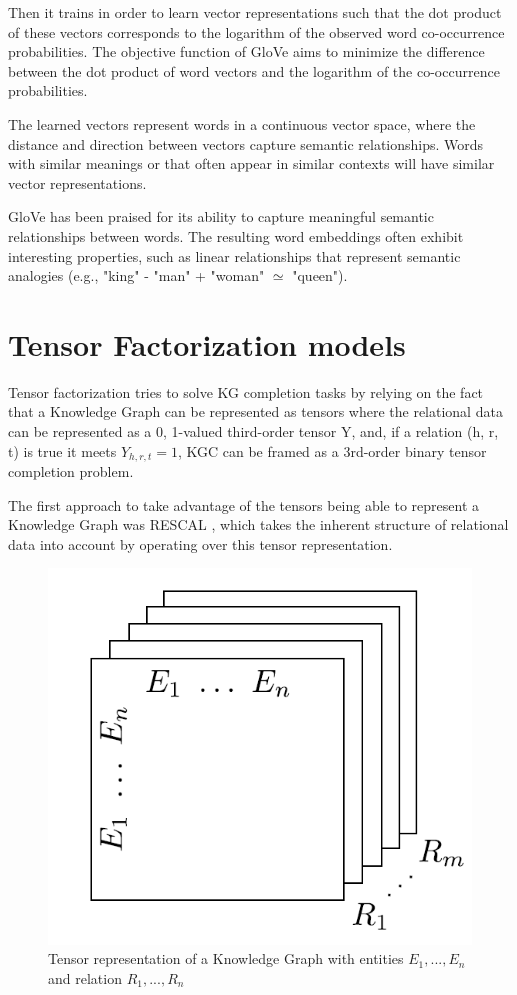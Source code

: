 Then it trains in order to learn vector representations such that the dot product of these vectors corresponds to the logarithm of the observed word co-occurrence probabilities. The objective function of GloVe aims to minimize the difference between the dot product of word vectors and the logarithm of the co-occurrence probabilities.

The learned vectors represent words in a continuous vector space, where the distance and direction between vectors capture semantic relationships. Words with similar meanings or that often appear in similar contexts will have similar vector representations.

GloVe has been praised for its ability to capture meaningful semantic relationships between words. The resulting word embeddings often exhibit interesting properties, such as linear relationships that represent semantic analogies (e.g., "king" - "man" + "woman" $\simeq$ "queen").


\section{Tensor Factorization models}\label{sec:emb-tensor}
Tensor factorization tries to solve KG completion tasks by relying on the fact that a Knowledge Graph can be represented as tensors where the relational data can be represented as a {0, 1}-valued third-order tensor Y, and, if a relation (h, r, t) is true it meets $Y_{h,r,t} = 1$, KGC can be framed as a 3rd-order binary tensor completion problem.

The first approach to take advantage of the tensors being able to represent a Knowledge Graph was RESCAL \cite{nickel2011three}, which takes the inherent structure of relational data into account by operating over this tensor representation.

\begin{figure}[!htp]
    \centering
    \includegraphics[width=.45\textwidth]{fig/embeddings/Rescal.png}
    \caption{Tensor representation of a Knowledge Graph \cite{shen2022comprehensive} with entities $E_1,...,E_n$ and relation $R_1,...,R_n$}
    \label{fig:emb-rescal}
\end{figure}

